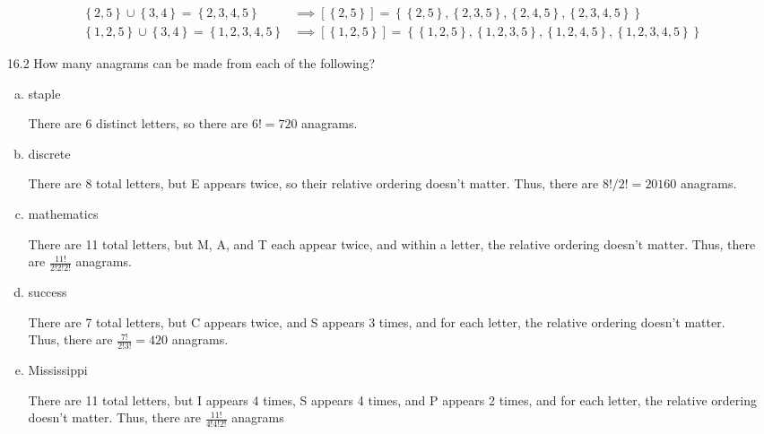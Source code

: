 \documentclass{article}
\begin{document}
\begin{itemize}
\begin{enumerate}[(a)]
\begin{soln}
\begin{align*}
						\left\{ 2, 5 \right\}\cup \left\{ 3, 4 \right\} = \left\{ 2, 3, 4, 5 \right\} &\implies \left[ \left\{ 2, 5 \right\} \right] = \left\{ \left\{ 2, 5 \right\}, \left\{ 2, 3, 5 \right\}, \left\{ 2, 4, 5 \right\}, \left\{ 2, 3, 4, 5 \right\} \right\} \\
						\left\{ 1, 2, 5 \right\} \cup \left\{ 3, 4 \right\} = \left\{ 1, 2, 3, 4, 5 \right\} &\implies \left[ \left\{ 1, 2, 5 \right\} \right] = \left\{ \left\{ 1, 2, 5 \right\}, \left\{ 1, 2, 3, 5 \right\}, \left\{ 1, 2, 4, 5 \right\}, \left\{ 1, 2, 3, 4, 5 \right\} \right\}
					\end{align*}
				\end{soln}
				
		\end{enumerate}

	\item[16.2] How many anagrams can be made from each of the following?
		\begin{enumerate}[(a)]
			\item staple
				\begin{soln}
					There are 6 distinct letters, so there are $6!=\boxed{720}$ anagrams.
				\end{soln}

			\item discrete
				\begin{soln}
					There are 8 total letters, but E appears twice, so their relative ordering doesn't matter. Thus, there are $8!/2!=\boxed{20160}$ anagrams.
				\end{soln}

			\item mathematics
				\begin{soln}
					There are 11 total letters, but M, A, and T each appear twice, and within a letter, the relative ordering doesn't matter. Thus, there are $\boxed{\frac{11!}{2!2!2!}}$ anagrams.
				\end{soln}

			\item success
				\begin{soln}
					There are 7 total letters, but C appears twice, and S appears 3 times, and for each letter, the relative ordering doesn't matter. Thus, there are $\frac{7!}{2!3!}=\boxed{420}$ anagrams.
				\end{soln}

			\item Mississippi
				\begin{soln}
					There are 11 total letters, but I appears 4 times, S appears 4 times, and P appears 2 times, and for each letter, the relative ordering doesn't matter. Thus, there are $\boxed{\frac{11!}{4!4!2!}}$ anagrams
				\end{soln}
				

\end{enumerate}
\end{itemize}
\end{document}
